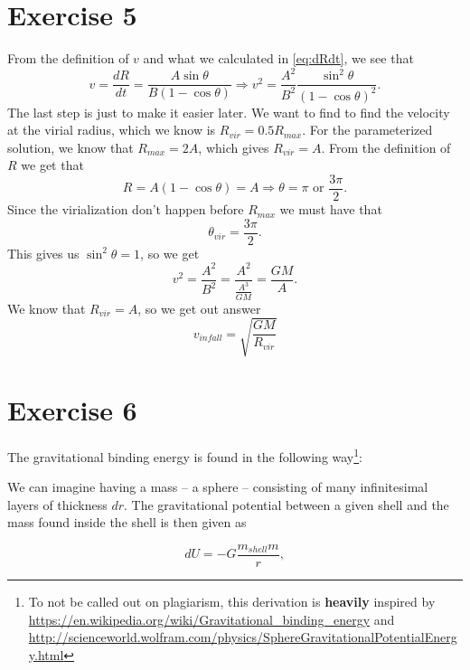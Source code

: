 \documentclass[a4paper,norsk, 10pt]{article}
\begin{document}
\section{Exercise 5}
From the definition of $v$ and what we calculated in \eqref{eq:dRdt}, we see that
\begin{equation}
v = \frac{dR}{dt} = \frac{A\sin\theta}{B(1-\cos \theta)} \Rightarrow v^2 = \frac{A^2}{B^2}\frac{\sin^2 \theta}{(1-\cos \theta)^2}.
\end{equation}
The last step is just to make it easier later. We want to find to find the velocity at the virial radius, which we know is $R_{vir} = 0.5R_{max}$. For the parameterized solution, we know that $R_{max} = 2A$, which gives $R_{vir} = A$. From the definition of $R$ we get that
\begin{equation}
R = A(1-\cos \theta) = A \Rightarrow \theta = \pi \text{ or } \frac{3\pi}{2}. 
\end{equation}
Since the virialization don't happen before $R_{max}$ we must have that
\begin{equation}
\theta_{vir} = \frac{3\pi}{2}.
\end{equation}
This gives us $\sin^2 \theta = 1$, so we get
\begin{equation}
v^2 = \frac{A^2}{B^2} = \frac{A^2}{\frac{A^3}{GM}} = \frac{GM}{A}.
\end{equation}
We know that $R_{vir} = A$, so we get out answer
\begin{equation}
v_{infall} = \sqrt{\frac{GM}{R_{vir}}}
\end{equation}

\section{Exercise 6}
The gravitational binding energy is found in the following way\footnote{To not be called out on plagiarism, this derivation is \textbf{heavily} inspired by \url{https://en.wikipedia.org/wiki/Gravitational_binding_energy} and \url{http://scienceworld.wolfram.com/physics/SphereGravitationalPotentialEnergy.html}}:

We can imagine having a mass -- a sphere -- consisting of many infinitesimal layers of thickness $dr$. The gravitational potential between a given shell and the mass found inside the shell is then given as 

\begin{equation}
dU = - G\frac{m_{shell}m}{r},
\end{equation}
\end{document}
